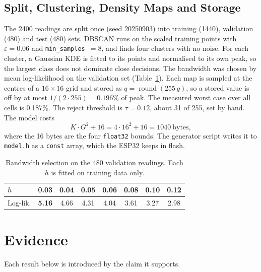 \documentclass[conference]{IEEEtran}
\begin{document}
\subsection{Split, Clustering, Density Maps and Storage}
The 2400 readings are split once (seed 20250903) into training (1440), validation (480) and test (480) sets. DBSCAN runs on the scaled training points with $\varepsilon = 0.06$ and \texttt{min\_samples}~$=8$, and finds four clusters with no noise. For each cluster, a Gaussian KDE is fitted to its points and normalised to its own peak, so the largest class does not dominate close decisions. The bandwidth was chosen by mean log-likelihood on the validation set (Table~\ref{tab:bandwidth}). Each map is sampled at the centres of a $16\times16$ grid and stored as $q = \operatorname{round}(255\,g)$, so a stored value is off by at most $1/(2\cdot255) = 0.196\%$ of peak. The measured worst case over all cells is 0.187\%. The reject threshold is $\tau = 0.12$, about 31 of 255, set by hand. The model costs
\begin{equation}
    K \cdot G^2 + 16 = 4 \cdot 16^2 + 16 = 1040\ \text{bytes},
    \label{eq:flash}
\end{equation}
where the 16 bytes are the four \texttt{float32} bounds. The generator script writes it to \texttt{model.h} as a \texttt{const} array, which the ESP32 keeps in flash.

\begin{table}[!bt]
\centering
\caption{Bandwidth selection on the 480 validation readings. Each $h$ is fitted on training data only.}
\label{tab:bandwidth}
\small\setlength{\tabcolsep}{4pt}
\begin{tabular}{@{}l ccccccc@{}}
\toprule
$h$ & \textbf{0.03} & 0.04 & 0.05 & 0.06 & 0.08 & 0.10 & 0.12 \\
\midrule
Log-lik. & \textbf{5.16} & 4.66 & 4.31 & 4.04 & 3.61 & 3.27 & 2.98 \\
\bottomrule
\end{tabular}
\end{table}

\section{Evidence}
\label{sec:evidence}
Each result below is introduced by the claim it supports.
\end{document}

